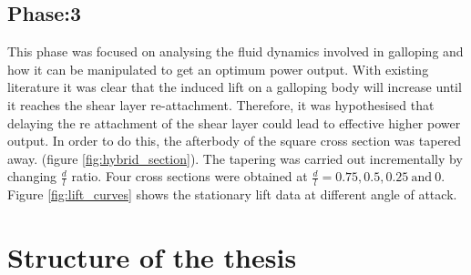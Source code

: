 \documentclass[authoryear,12pt]{article}
\begin{document}
\clearpage

\subsection{Phase:3}

This phase was focused on analysing the fluid dynamics involved in galloping and how it can be manipulated to get an optimum power output. With existing literature it was clear that the induced lift on a galloping body will increase until it reaches the shear layer re-attachment. Therefore, it was hypothesised that delaying the re attachment of the shear layer could lead to effective higher power output. In order to do this, the afterbody of the square cross section was tapered away. (figure \ref{fig:hybrid_section}). The tapering was carried out incrementally by changing $\frac{d}{l}$ ratio. Four cross sections were obtained at $\frac{d}{l}= 0.75,0.5,0.25 \ \text{and} \ 0$. Figure \ref{fig:lift_curves} shows the stationary lift data at different angle of attack. 


 
 \vspace{30mm}







\clearpage

\section{Structure of the thesis}
\end{document}
